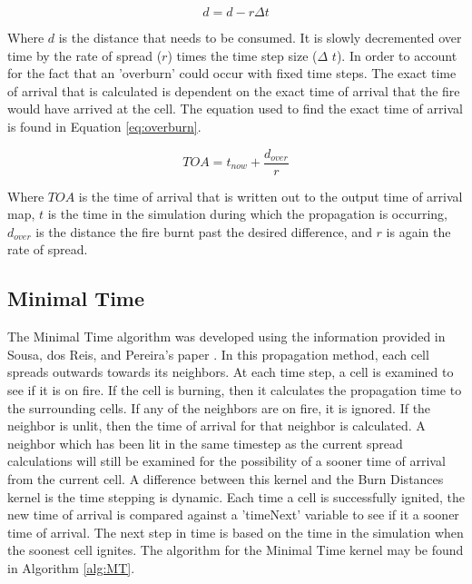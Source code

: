 \begin{equation}
d = d - r \Delta t
\label{eq:burn}
\end{equation}

Where $d$ is the distance that needs to be consumed. It is slowly decremented over time by the rate of spread ($r$) times the time step size ($\Delta$ $t$). In order to account for the fact that an 'overburn' could occur with fixed time steps. The exact time of arrival that is calculated is dependent on the exact time of arrival that the fire would have arrived at the cell. The equation used to find the exact time of arrival is found in Equation \ref{eq:overburn}. 

\begin{equation}
TOA = t_{now} + \frac{d_{over}}{r}
\label{eq:overburn}
\end{equation}

Where $TOA$ is the time of arrival that is written out to the output time of arrival map, $t$ is the time in the simulation during which the propagation is occurring, $d_{over}$ is the distance the fire burnt past the desired difference, and $r$ is again the rate of spread. 

\subsection{Minimal Time}

The Minimal Time algorithm was developed using the information provided in Sousa, dos Reis, and Pereira's paper \cite{gpufire}. In this propagation method, each cell spreads outwards towards its neighbors. At each time step, a cell is examined to see if it is on fire. If the cell is burning, then it calculates the propagation time to the surrounding cells. If any of the neighbors are on fire, it is ignored. If the neighbor is unlit, then the time of arrival for that neighbor is calculated. A neighbor which has been lit in the same timestep as the current spread calculations will still be examined for the possibility of a sooner time of arrival from the current cell. A difference between this kernel and the Burn Distances kernel is the time stepping is dynamic. Each time a cell is successfully ignited, the new time of arrival is compared against a 'timeNext' variable to see if it a sooner time of arrival. The next step in time is based on the time in the simulation when the soonest cell ignites. The algorithm for the Minimal Time kernel may be found in Algorithm \ref{alg:MT}.

